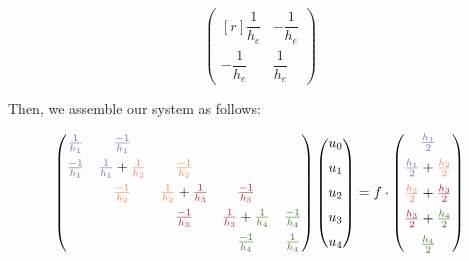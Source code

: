 \begin{example}
\[
  \begin{pmatrix*}[r]
    \dfrac{1}{h_e}  & -\dfrac{1}{h_e} \\[0.35cm]
    -\dfrac{1}{h_e} & \dfrac{1}{h_e}
  \end{pmatrix*}
\]

Then, we assemble our system as follows:

\newcommand{\tcb}[1]{\textcolor{CadetBlue}{#1}}
\newcommand{\tcm}[1]{\textcolor{Peach}{#1}}
\newcommand{\tcs}[1]{\textcolor{Maroon}{#1}}
\newcommand{\tcg}[1]{\textcolor{OliveGreen}{#1}}
\newcommand{\tce}[1]{\textcolor{MidnightBlue}{#1}}

\[
\begin{pmatrix}
  \tcb{\frac{1}{h_1}}  & \tcb{\frac{-1}{h_1}}                                                                                                                                     \\[0.2cm]
  \tcb{\frac{-1}{h_1}} & \tcb{\frac{1}{h_1}} + \tcm{\frac{1}{h_2}} & \tcm{\frac{-1}{h_2}}                                                                                         \\[0.2cm]
                       & \tcm{\frac{-1}{h_2}}                      & \tcm{\frac{1}{h_2}} + \tcs{\frac{1}{h_3}} & \tcs{\frac{-1}{h_3}}                                             \\[0.2cm]
                       &                                           & \tcs{\frac{-1}{h_3}}                      & \tcs{\frac{1}{h_3}} + \tcg{\frac{1}{h_4}} & \tcg{\frac{-1}{h_4}} \\[0.2cm]
                       &                                           &                                           & \tcg{\frac{-1}{h_4}}                      & \tcg{\frac{1}{h_4}}
\end{pmatrix}
\begin{pmatrix}
  u_0 \\[0.2cm] u_1 \\[0.2cm] u_2 \\[0.2cm] u_3 \\[0.2cm] u_4
\end{pmatrix} = 
f\cdot
\begin{pmatrix}
  \tcb{\frac{h_1}{2}} \\[0.2cm] \tcb{\frac{h_1}{2}} + \tcm{\frac{h_2}{2}} \\[0.2cm] \tcm{\frac{h_2}{2}} + \tcs{\frac{h_3}{2}} \\[0.2cm] 
  \tcs{\frac{h_3}{2}} + \tcg{\frac{h_4}{2}} \\[0.2cm] \tcg{\frac{h_4}{2}}
\end{pmatrix}
\]


\end{example}
